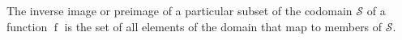 The inverse image or preimage of a particular subset of the codomain $\mathcal{S}$ of a function $\operatorname{f}$ is the set of all elements of the domain that map to members of $\mathcal{S}$.  

